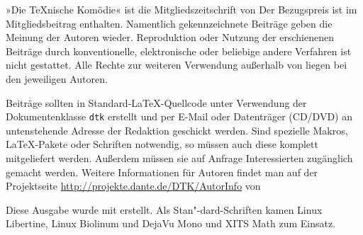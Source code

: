 \begingroup
\small

»Die \TeX{}nische Komödie« ist die Mitgliedszeitschrift von
\dante{} Der Bezugspreis ist im Mitgliedsbeitrag enthalten.
Namentlich gekennzeichnete Beiträge geben die Meinung der
Autoren wieder.  Reproduktion oder Nutzung der erschienenen
Beiträge durch konventionelle, elektronische oder beliebige andere
Verfahren ist nicht gestattet. Alle Rechte zur weiteren Verwendung
außerhalb von \dante{} liegen bei den jeweiligen Autoren.

Beiträge sollten in Standard-\LaTeX-Quellcode unter Verwendung der
Dokumentenklasse \texttt{dtk} erstellt und per \mbox{E-Mail} oder
Datenträger (CD/DVD) an untenstehende Adresse
der Redaktion geschickt werden.  Sind
spezielle Makros, \LaTeX-Pakete oder Schriften notwendig, so
müssen auch diese komplett mitgeliefert werden.  Außerdem müssen sie auf
Anfrage Interessierten zugänglich gemacht werden. Weitere Informationen
für Autoren
findet man auf der Projektseite \url{http://projekte.dante.de/DTK/AutorInfo}
von \dante

\smallskip


Diese Ausgabe wurde mit \texttt{\InfoTeX} erstellt.
Als Stan"-dard-Schriften kamen Linux Libertine, Linux Biolinum
und DejaVu Mono und XITS Math zum Einsatz.


